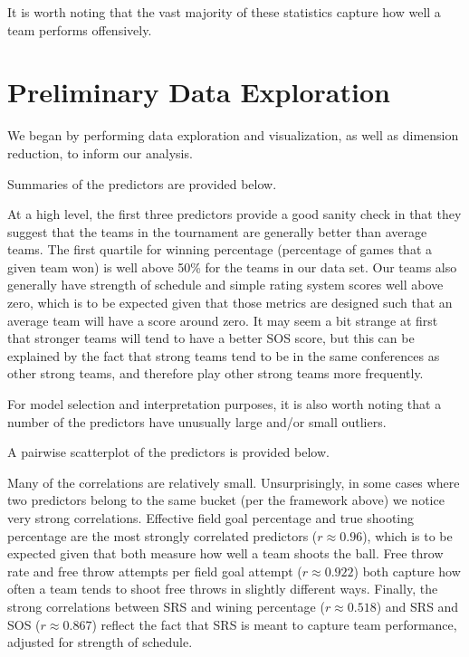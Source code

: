 \documentclass[10pt,a4paper, hidelinks]{article} %
\begin{document}
It is worth noting that the vast majority of these statistics capture how well a team performs offensively.  

\section{Preliminary Data Exploration}
We began by performing data exploration and visualization, as well as dimension reduction, to inform our analysis.

Summaries of the predictors are provided below.


At a high level, the first three predictors provide a good sanity check in that they suggest that the teams in the tournament are generally better than average teams. The first quartile for winning percentage (percentage of games that a given team won) is well above 50\% for the teams in our data set. Our teams also generally have strength of schedule and simple rating system scores well above zero, which is to be expected given that those metrics are designed such that an average team will have a score around zero. It may seem a bit strange at first that stronger teams will tend to have a better SOS score, but this can be explained by the fact that strong teams tend to be in the same conferences as other strong teams, and therefore play other strong teams more frequently.

For model selection and interpretation purposes, it is also worth noting that a number of the predictors have unusually large and/or small outliers.

A pairwise scatterplot of the predictors is provided below.


Many of the correlations are relatively small. Unsurprisingly, in some cases where two predictors belong to the same bucket (per the framework above) we notice very strong correlations. Effective field goal percentage and true shooting percentage are the most strongly correlated predictors ($r \approx 0.96$), which is to be expected given that both measure how well a team shoots the ball. Free throw rate and free throw attempts per field goal attempt ($r \approx 0.922$) both capture how often a team tends to shoot free throws in slightly different ways. Finally, the strong correlations between SRS and wining percentage ($r \approx 0.518$) and SRS and SOS ($r \approx 0.867$) reflect the fact that SRS is meant to capture team performance, adjusted for strength of schedule. 
\end{document}

